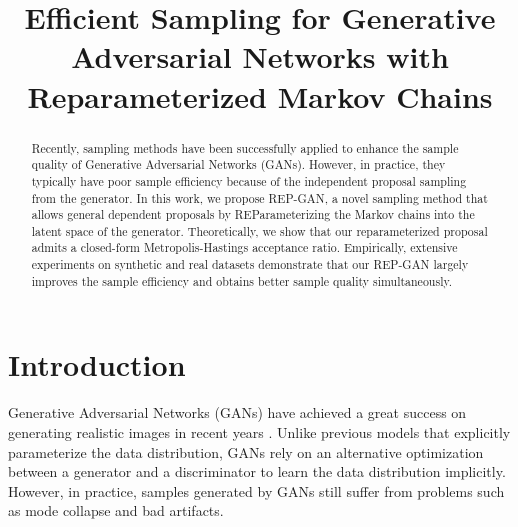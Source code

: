 \documentclass{article} %
\title{Efficient Sampling for Generative Adversarial Networks with Reparameterized Markov Chains}
\newcommand{\<}{\left\langle}
\renewcommand{\>}{\right\rangle}
\begin{document}
\maketitle

\begin{abstract}
Recently, sampling methods have been successfully applied to enhance the sample quality of Generative Adversarial Networks (GANs). However, in practice, they typically have poor sample efficiency because of the independent proposal sampling from the generator. 
In this work, we propose REP-GAN, a novel sampling method that allows general dependent proposals by REParameterizing the Markov chains
into the latent space of the generator.
Theoretically, we show that our reparameterized proposal admits a closed-form Metropolis-Hastings acceptance ratio.
Empirically, extensive experiments on synthetic and real datasets demonstrate that our REP-GAN largely improves the sample efficiency and obtains better sample quality simultaneously.
\end{abstract}

\section{Introduction}

Generative Adversarial Networks (GANs) \citep{goodfellow2014generative} have achieved a great success on generating realistic images in recent years \citep{karras2019style,brock2018large}. Unlike previous models that explicitly parameterize the data distribution, GANs rely on an alternative optimization between a generator and a discriminator to learn the data distribution implicitly. However, in practice, samples generated by GANs still suffer from problems such as mode collapse and bad artifacts. 
\end{document}
